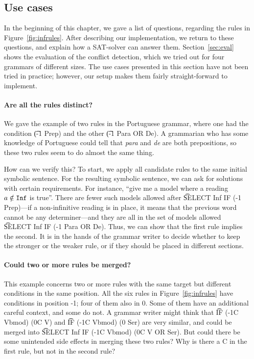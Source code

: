 {{\subsection{Use cases}

In the beginning of this chapter, we gave a list of questions, regarding the rules in Figure~\ref{fig:infrules}. After describing our implementation, we return to these questions, and explain how a SAT-solver can answer them.
Section~\ref{sec:eval} shows the evaluation of the conflict detection, which we tried out for four grammars of different sizes.
The use cases presented in this section have not been tried in practice; however, our setup makes them fairly straight-forward to implement.

\paragraph{Are all the rules distinct?} We gave the example of two rules in the Portuguese grammar, where one had the condition \t{(-1 Prep)} and the other \t{(-1 Para OR De)}. A grammarian who has some knowledge of Portuguese could tell that {\em para} and {\em de} are both prepositions, so these two rules seem to do almost the same thing.

How can we verify this? To start, we apply all candidate rules to the same initial symbolic sentence. For the resulting symbolic sentence, we can ask for solutions with certain requirements.
For instance, ``give me a model where a reading $a \notin \texttt{Inf}$ is true''.
There are fewer such models allowed after \t{SELECT Inf IF (-1 Prep)}---if
a non-infinitive reading is in place, it means that the previous word cannot be any determiner---and
they are all in the set of models allowed \t{SELECT Inf IF (-1 Para OR De)}. Thus, we can show that the first rule implies the second. It is in the hands of the grammar writer to decide whether to keep the stronger or the weaker rule, or if they should be placed in different sections.


\paragraph{Could two or more rules be merged?} This example concerns two or more rules with the same target but different conditions in the same position.
All the six rules in Figure~\ref{fig:infrules} have conditions in position -1; four of them also in 0. Some of them have an additional careful context, and some do not.
A grammar writer might think that \t{IF (-1C Vbmod) (0C V)} and \t{IF (-1C Vbmod) (0 Ser)} are very similar, and could be merged into \t{SELECT Inf IF (-1C Vbmod) (0C V OR Ser)}. But could there be some unintended side effects in merging these two rules? Why is there a C in the first rule, but not in the second rule?

}}
